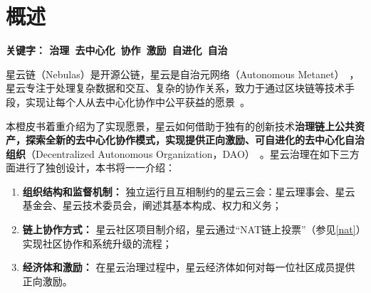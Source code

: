 \section{概述}

\textbf{关键字： 治理\ 去中心化\ 协作\ 激励\ 自进化\ 自治 }

\vspace{2em}

星云链（Nebulas）是开源公链，星云是自治元网络（Autonomous Metanet）~\cite{AutonomousMetanet}，星云专注于处理复杂数据和交互、复杂的协作关系，致力于通过区块链等技术手段，实现让每个人从去中心化协作中公平获益的愿景~\cite{vision}。

本橙皮书着重介绍为了实现愿景，星云如何借助于独有的创新技术\textbf{治理链上公共资产，探索全新的去中心化协作模式，实现提供正向激励、可自进化的去中心化自治组织}（Decentralized Autonomous Organization，DAO）~\cite{DAO}。星云治理在如下三方面进行了独创设计，本书将一一介绍：

\begin{enumerate}
	\item \textbf{组织结构和监督机制：}
	独立运行且互相制约的星云三会：星云理事会、星云基金会、星云技术委员会，阐述其基本构成、权力和义务；
	\item \textbf{链上协作方式：}
	星云社区项目制介绍，星云通过“NAT链上投票”（参见\ref{nat}）实现社区协作和系统升级的流程；
	\item \textbf{经济体和激励：}
	在星云治理过程中，星云经济体如何对每一位社区成员提供正向激励。
\end{enumerate}